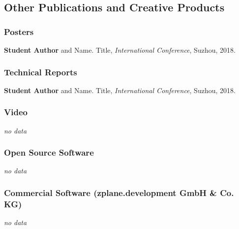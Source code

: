 \subsection{Other Publications and Creative Products}

    \subsubsection{Posters}\label{subsubsec:poster}
        \begin{subnum}
            \item  {\mark \textbf{Student Author} and Name. Title, \textit{International Conference}, Suzhou, 2018.}
        \end{subnum}

    \subsubsection{Technical Reports}\label{subsubsec:technical-reports}
        \begin{subnum}
            \item  {\mark \textbf{Student Author} and Name. Title, \textit{International Conference}, Suzhou, 2018.}
        \end{subnum}

    \subsubsection{Video}\label{subsubsec:video}
        \begin{subnum}
            \item   \textsl{no data}
        \end{subnum}

    \subsubsection{Open Source Software}\label{subsubsec:softwaredl1}
        \begin{subnum}
            \item   \textsl{no data}
        \end{subnum}

    \subsubsection{Commercial Software (zplane.development GmbH \& Co. KG)}\label{subsubsec:softwaredl2}
        \begin{subnum}
            \item   \textsl{no data}
        \end{subnum}

